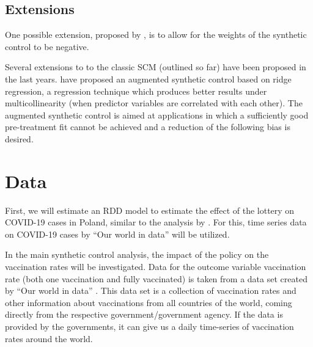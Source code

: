 \documentclass{scrbook}
\begin{document}
\subsection*{Extensions}

One possible extension, proposed by
\textcite{doudchenko_balancing_2016}, is to allow for the weights of the
synthetic control to be negative.

Several extensions to to the classic SCM (outlined so far) have been
proposed in the last years. \textcite{ben-michael_augmented_2021} have
proposed an augmented synthetic control based on ridge regression, a
regression technique which produces better results under
multicollinearity (when predictor variables are correlated with each
other). The augmented synthetic control is aimed at applications in
which a sufficiently good pre-treatment fit cannot be achieved and a
reduction of the following bias is desired.

\section{Data}

First, we will estimate an RDD model to estimate the effect of the
lottery on COVID-19 cases in Poland, similar to the analysis by
\textcite{kuznetsova_effectiveness_2022}. For this, time series data on
COVID-19 cases by ``Our world in data'' will be utilized.

In the main synthetic control analysis, the impact of the policy on the
vaccination rates will be investigated. Data for the outcome variable
vaccination rate (both one vaccination and fully vaccinated) is taken
from a data set created by ``Our world in data''
\parencite{mathieu_global_2021}. This data set is a collection of
vaccination rates and other information about vaccinations from all
countries of the world, coming directly from the respective
government/government agency. If the data is provided by the
governments, it can give us a daily time-series of vaccination rates
around the world.
\end{document}
